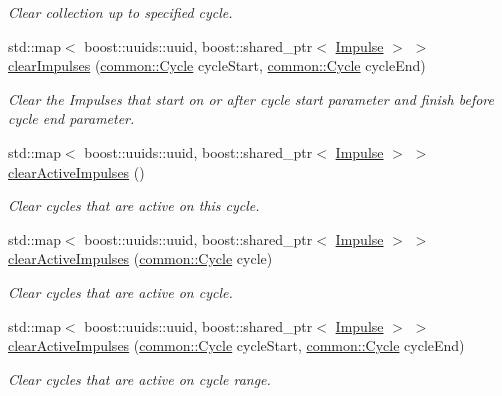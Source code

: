 \begin{DoxyCompactItemize}
\begin{DoxyCompactList}\small\item\em \-Clear collection up to specified cycle. \end{DoxyCompactList}\item 
std\-::map$<$ boost\-::uuids\-::uuid, \*
boost\-::shared\-\_\-ptr$<$ \hyperlink{classcryomesh_1_1components_1_1Impulse}{\-Impulse} $>$ $>$ \hyperlink{classcryomesh_1_1components_1_1ImpulseCollection_abe07a298df807be2c62eadf976e02027}{clear\-Impulses} (\hyperlink{classcryomesh_1_1common_1_1Cycle}{common\-::\-Cycle} cycle\-Start, \hyperlink{classcryomesh_1_1common_1_1Cycle}{common\-::\-Cycle} cycle\-End)
\begin{DoxyCompactList}\small\item\em \-Clear the \-Impulses that start on or after cycle start parameter and finish before cycle end parameter. \end{DoxyCompactList}\item 
std\-::map$<$ boost\-::uuids\-::uuid, \*
boost\-::shared\-\_\-ptr$<$ \hyperlink{classcryomesh_1_1components_1_1Impulse}{\-Impulse} $>$ $>$ \hyperlink{classcryomesh_1_1components_1_1ImpulseCollection_a13560031007e894ea8d8d6cb0bdf48ff}{clear\-Active\-Impulses} ()
\begin{DoxyCompactList}\small\item\em \-Clear cycles that are active on this cycle. \end{DoxyCompactList}\item 
std\-::map$<$ boost\-::uuids\-::uuid, \*
boost\-::shared\-\_\-ptr$<$ \hyperlink{classcryomesh_1_1components_1_1Impulse}{\-Impulse} $>$ $>$ \hyperlink{classcryomesh_1_1components_1_1ImpulseCollection_a34f24b20735831c72fb4db04d014cff3}{clear\-Active\-Impulses} (\hyperlink{classcryomesh_1_1common_1_1Cycle}{common\-::\-Cycle} cycle)
\begin{DoxyCompactList}\small\item\em \-Clear cycles that are active on cycle. \end{DoxyCompactList}\item 
std\-::map$<$ boost\-::uuids\-::uuid, \*
boost\-::shared\-\_\-ptr$<$ \hyperlink{classcryomesh_1_1components_1_1Impulse}{\-Impulse} $>$ $>$ \hyperlink{classcryomesh_1_1components_1_1ImpulseCollection_a79fffb878409aff462a5fe9b1c1917f8}{clear\-Active\-Impulses} (\hyperlink{classcryomesh_1_1common_1_1Cycle}{common\-::\-Cycle} cycle\-Start, \hyperlink{classcryomesh_1_1common_1_1Cycle}{common\-::\-Cycle} cycle\-End)
\begin{DoxyCompactList}\small\item\em \-Clear cycles that are active on cycle range. \end{DoxyCompactList}\item 

\end{DoxyCompactItemize}
